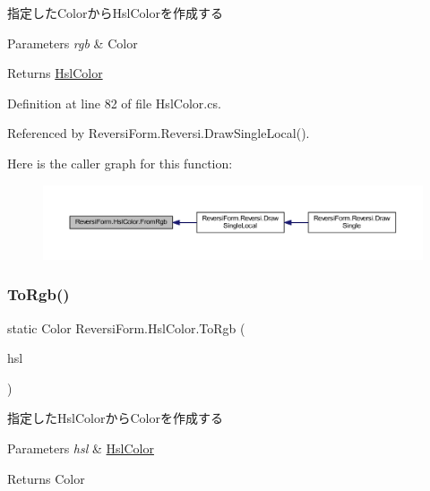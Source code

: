 指定した\+Colorから\+Hsl\+Colorを作成する 


\begin{DoxyParams}{Parameters}
{\em rgb} & Color\\
\hline
\end{DoxyParams}
\begin{DoxyReturn}{Returns}
\hyperlink{class_reversi_form_1_1_hsl_color}{Hsl\+Color}
\end{DoxyReturn}


Definition at line 82 of file Hsl\+Color.\+cs.



Referenced by Reversi\+Form.\+Reversi.\+Draw\+Single\+Local().

Here is the caller graph for this function\+:\nopagebreak
\begin{figure}[H]
\begin{center}
\leavevmode
\includegraphics[width=350pt]{class_reversi_form_1_1_hsl_color_a1ef52b0701860ca2021e74e8ee369789_icgraph}
\end{center}
\end{figure}
\mbox{\label{class_reversi_form_1_1_hsl_color_aa7036039dd3abc7a1216be97656467df}} 
\subsubsection{\texorpdfstring{To\+Rgb()}{ToRgb()}}
{\footnotesize\ttfamily static Color Reversi\+Form.\+Hsl\+Color.\+To\+Rgb (\begin{DoxyParamCaption}\item[{\hyperlink{class_reversi_form_1_1_hsl_color}{Hsl\+Color}}]{hsl }\end{DoxyParamCaption})\hspace{0.3cm}{\ttfamily [static]}}



指定した\+Hsl\+Colorから\+Colorを作成する 


\begin{DoxyParams}{Parameters}
{\em hsl} & \hyperlink{class_reversi_form_1_1_hsl_color}{Hsl\+Color}\\
\hline
\end{DoxyParams}
\begin{DoxyReturn}{Returns}
Color
\end{DoxyReturn}


